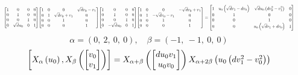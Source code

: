 \documentclass[11pt]{article}
\theoremstyle{definition}
\begin{document}
\[
\scaletoalign{\textwidth}{{\left[\begin{matrix}1 & 0 & 0 & 0\\0 & 1 & 0 & 0\\0 & 0 & 1 & 0\\0 & \sqrt{d} u_{0} & 0 & 1\end{matrix}\right]} {\left[\begin{matrix}1 & 0 & 0 & \sqrt{d} v_{0} - v_{1}\\0 & 1 & \sqrt{d} v_{0} + v_{1} & 0\\0 & 0 & 1 & 0\\0 & 0 & 0 & 1\end{matrix}\right]} {\left[\begin{matrix}1 & 0 & 0 & 0\\0 & 1 & 0 & 0\\0 & 0 & 1 & 0\\0 & - \sqrt{d} u_{0} & 0 & 1\end{matrix}\right]} {\left[\begin{matrix}1 & 0 & 0 & - \sqrt{d} v_{0} + v_{1}\\0 & 1 & - \sqrt{d} v_{0} - v_{1} & 0\\0 & 0 & 1 & 0\\0 & 0 & 0 & 1\end{matrix}\right]} = {\left[\begin{matrix}1 & u_{0} \left(\sqrt{d} v_{1} - d v_{0}\right) & \sqrt{d} u_{0} \left(d v_{0}^{2} - v_{1}^{2}\right) & 0\\0 & 1 & 0 & 0\\0 & 0 & 1 & 0\\0 & 0 & u_{0} \left(\sqrt{d} v_{1} + d v_{0}\right) & 1\end{matrix}\right]}}
\]
\[
\alpha = \left( 0, \  2, \  0, \  0\right), \quad \beta = \left( -1, \  -1, \  0, \  0\right)
\]
\[
\scaletoalign{\textwidth}{\left[ X_{\alpha}\left(u_{0}\right), X_{\beta}\left(\left[\begin{matrix}v_{0}\\v_{1}\end{matrix}\right]\right) \right] = X_{\alpha + \beta}\left(\left[\begin{matrix}d u_{0} v_{1}\\u_{0} v_{0}\end{matrix}\right]\right) X_{\alpha + 2\beta}\left(u_{0} \left(d v_{1}^{2} - v_{0}^{2}\right)\right)}
\]
\end{document}

